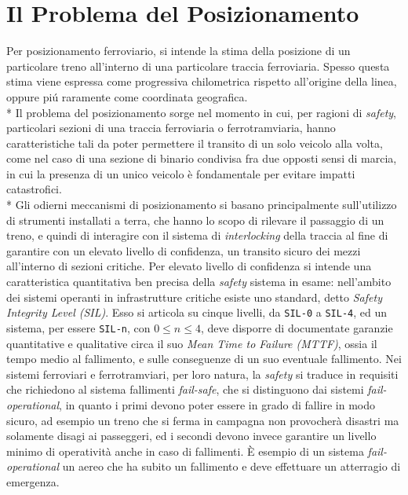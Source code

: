 \section{Il Problema del Posizionamento}
Per posizionamento ferroviario, si intende la stima della posizione di un particolare treno all'interno di una particolare traccia ferroviaria. Spesso questa stima viene espressa come progressiva chilometrica rispetto all'origine della linea, oppure pi\'u raramente come coordinata geografica.\\*
Il problema del posizionamento sorge nel momento in cui, per ragioni di \emph{safety}, particolari sezioni di una traccia ferroviaria o ferrotramviaria, hanno caratteristiche tali da poter permettere il transito di un solo veicolo alla volta, come nel caso di una sezione di binario condivisa fra due opposti sensi di marcia, in cui la presenza di un unico veicolo \`e fondamentale per evitare impatti catastrofici.\\*
Gli odierni meccanismi di posizionamento si basano principalmente sull'utilizzo di strumenti installati a terra, che hanno lo scopo di rilevare il passaggio di un treno, e quindi di interagire con il sistema di \emph{interlocking} della traccia al fine di garantire con un elevato livello di confidenza, un transito sicuro dei mezzi all'interno di sezioni critiche. Per elevato livello di confidenza si intende una caratteristica quantitativa ben precisa della \emph{safety} sistema in esame: nell'ambito dei sistemi operanti in infrastrutture critiche esiste uno standard, detto \emph{Safety Integrity Level (SIL)}. Esso si articola su cinque livelli, da \texttt{SIL-0} a \texttt{SIL-4}, ed un sistema, per essere \texttt{SIL-n}, con $0\le n\le 4$, deve disporre di documentate garanzie quantitative e qualitative circa il suo \emph{Mean Time to Failure (MTTF)}, ossia il tempo medio al fallimento, e sulle conseguenze di un suo eventuale fallimento. Nei sistemi ferroviari e ferrotramviari, per loro natura, la \emph{safety} si traduce in requisiti che richiedono al sistema fallimenti \emph{fail-safe}, che si distinguono dai sistemi \emph{fail-operational}, in quanto i primi devono poter essere in grado di fallire in modo sicuro, ad esempio un treno che si ferma in campagna non provocher\`a disastri ma solamente disagi ai passeggeri, ed i secondi devono invece garantire un livello minimo di operativit\`a anche in caso di fallimenti. \`E esempio di un sistema \emph{fail-operational} un aereo che ha subito un fallimento e deve effettuare un atterragio di emergenza.
